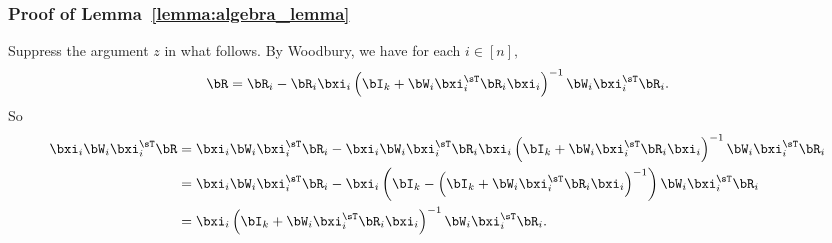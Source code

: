 \subsubsection{
Proof of Lemma~\ref{lemma:algebra_lemma}}
\label{sec:proof_lemma_algebra_lemma}
Suppress the argument $z$ in what follows.
By Woodbury, we have for each $i\in[n],$
\begin{equation}
\nonumber
\bR  = \bR_i - \bR_i\bxi_i
\left(\bI_k + \bW_i\bxi_i^\sT \bR_i \bxi_i\right)^{-1} \bW_i\bxi_i^\sT \bR_i.
\end{equation}
So
\begin{align*}
 \bxi_i \bW_i\bxi_i^\sT \bR 
&= 
 \bxi_i \bW_i\bxi_i^\sT  \bR_i -
\bxi_i \bW_i\bxi_i^\sT
\bR_i\bxi_i
\left(\bI_k + \bW_i\bxi_i^\sT \bR_i \bxi_i\right)^{-1} \bW_i\bxi_i^\sT \bR_i\\
&= 
 \bxi_i \bW_i\bxi_i^\sT  \bR_i -
\bxi_i
\left(
\bI_k - 
\left(\bI_k +\bW_i \bxi_i^\sT \bR_i \bxi_i\right)^{-1}
\right)
\bW_i\bxi_i^\sT \bR_i\\
&=
\bxi_i
\left(\bI_k + \bW_i\bxi_i^\sT \bR_i \bxi_i\right)^{-1}
\bW_i\bxi_i^\sT \bR_i.
\end{align*}

